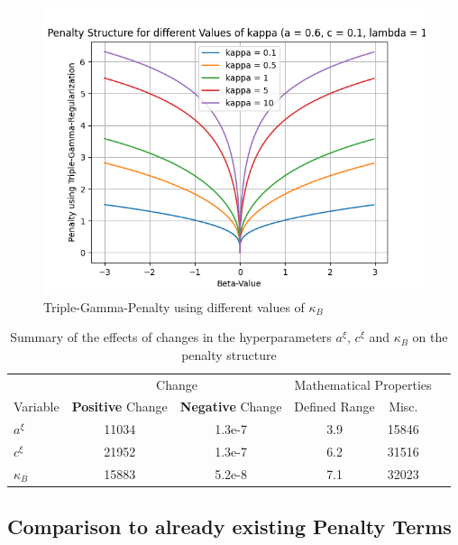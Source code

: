 \documentclass[12pt,a4paper]{article}
\begin{document}
\begin{figure}[!h]
\centering
\includegraphics[scale=0.75]{../02_simulation/021_simulation_figures/TGPenalty_ChangeInKappa.png}
\caption{Triple-Gamma-Penalty using different values of $\kappa_B$}
\label{fig:basicTGPen}
\end{figure}


\begin{table}[!h]
\centering
\begin{tabular}{lcccccc}\toprule
		& \multicolumn{2}{c}{Change} & \multicolumn{3}{c}{Mathematical Properties}\\
		\cmidrule(r{4pt}){2-3} \cmidrule(l){4-5}
Variable     	& \textbf{Positive} Change  & \textbf{Negative} Change & Defined Range & Misc.\\\midrule
$a^\xi$  	& 11034 & 1.3e-7 & 3.9 & 15846 \\
$c^\xi$ 		& 21952 & 1.3e-7 & 6.2 & 31516 \\
$\kappa_B$ 	& 15883 & 5.2e-8 & 7.1 & 32023 \\\bottomrule
\end{tabular}
\caption{Summary of the effects of changes in the hyperparameters $a^\xi$, $c^\xi$ and $\kappa_B$ on the penalty structure}
\label{tab:VariationsInHyperparameters}
\end{table}
\newpage

\subsection{Comparison to already existing Penalty Terms}\label{subsec:comparepenalties}
\end{document}
